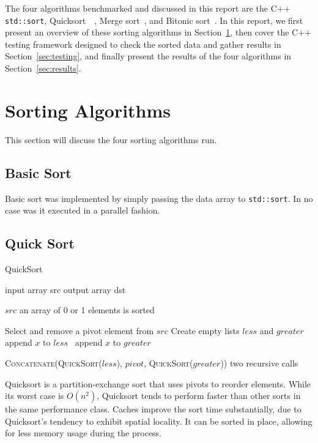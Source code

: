 \documentclass[journal]{IEEEtran}
\begin{document}
The four algorithms benchmarked and discussed in this report are the C++ \texttt{std::sort}, Quicksort~\cite{Hoare1961}~\cite{Hoare1962}, Merge sort~\cite{Knuth:1998:ACP:280635}, and Bitonic sort~\cite{Batcher1968}. In this report, we first present an overview of these sorting algorithms in Section~\ref{sec:sorting}, then cover the C++ testing framework designed to check the sorted data and gather results in Section~\ref{sec:testing}, and finally present the results of the four algorithms in Section~\ref{sec:results}.

\section{Sorting Algorithms}
\label{sec:sorting}
This section will discuss the four sorting algorithms run.

\subsection{Basic Sort}
Basic sort was implemented by simply passing the data array to \texttt{std::sort}. In no case was it executed in a parallel fashion.

\subsection{Quick Sort}
\linespread{1}
\begin{algorithm*}[t]

\caption{QuickSort}\label{alg:quicksort}
\begin{algorithmic}
\Require input array src
\Require output array dst

	\State \Return $src$ \Comment an array of 0 or 1 elements is sorted
\EndIf

\State Select and remove a pivot element from $src$
\State Create empty lists $less$ and $greater$
	 append $x$ to $less$
	\Else \ append $x$ to $greater$
	\EndIf
\EndFor
\item[]
\Return \textsc{Concatenate}(\textsc{QuickSort}($less$), $pivot$, \textsc{QuickSort}($greater$)) \Comment two recursive calls
\EndProcedure
\end{algorithmic}
\end{algorithm*}
\linespread{1.5}


Quicksort is a partition-exchange sort that uses pivots to reorder elements. While its worst case is $O(n^2)$, Quicksort tends to perform faster than other sorts in the same performance class. Caches improve the sort time substantially, due to Quicksort's tendency to exhibit spatial locality. It can be sorted in place, allowing for less memory usage during the process. 
\end{document}
